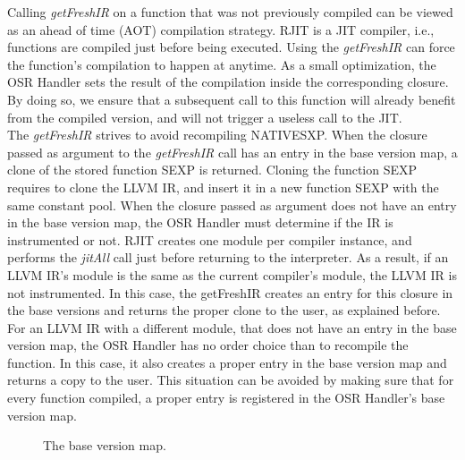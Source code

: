 Calling \textit{getFreshIR} on a function that was not previously compiled can be viewed as an ahead of time (AOT) compilation strategy.
RJIT is a JIT compiler, i.e., functions are compiled just before being executed.
Using the \textit{getFreshIR} can force the function's compilation to happen at anytime.
As a small optimization, the OSR Handler sets the result of the compilation inside the corresponding closure.
By doing so, we ensure that a subsequent call to this function will already benefit from the compiled version, and will not trigger a useless call to the JIT.\\

The \textit{getFreshIR} strives to avoid recompiling NATIVESXP.
When the closure passed as argument to the \textit{getFreshIR} call has an entry in the base version map, a clone of the stored function SEXP is returned.
Cloning the function SEXP requires to clone the LLVM IR, and insert it in a new function SEXP with the same constant pool.
When the closure passed as argument does not have an entry in the base version map, the OSR Handler must determine if the IR is instrumented or not.
RJIT creates one module per compiler instance, and performs the \textit{jitAll} call just before returning to the interpreter.
As a result, if an LLVM IR's module is the same as the current compiler's module, the LLVM IR is not instrumented.
In this case, the getFreshIR creates an entry for this closure in the base versions and returns the proper clone to the user, as explained before.
For an LLVM IR with a different module, that does not have an entry in the base version map, the OSR Handler has no order choice than to recompile the function.
In this case, it also creates a proper entry in the base version map and returns a copy to the user.
This situation can be avoided by making sure that for every function compiled, a proper entry is registered in the OSR Handler's base version map.\\

\begin{figure}[h]
\caption{The base version map.}
\label{fig:baseversionmap}
\end{figure}

